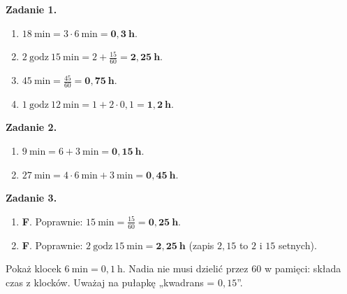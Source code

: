 \documentclass[11pt,a4paper]{article}
\begin{document}

\vspace{0.6em}
\textbf{Zadanie 1.}
\begin{enumerate}[label=\alph*), leftmargin=*, itemsep=4pt]
  \item $18\ \text{min}=3\cdot 6\ \text{min}=\mathbf{0{,}3\ h}$.
  \item $2\ \text{godz}\ 15\ \text{min}=2+\frac{15}{60}=\mathbf{2{,}25\ h}$.
  \item $45\ \text{min}=\frac{45}{60}=\mathbf{0{,}75\ h}$.
  \item $1\ \text{godz}\ 12\ \text{min}=1+2\cdot 0{,}1=\mathbf{1{,}2\ h}$.
\end{enumerate}

\textbf{Zadanie 2.}
\begin{enumerate}[label=\alph*), leftmargin=*, itemsep=4pt]
  \item $9\ \text{min}=6+3\ \text{min}=\mathbf{0{,}15\ h}$.
  \item $27\ \text{min}=4\cdot 6\ \text{min}+3\ \text{min}=\mathbf{0{,}45\ h}$.
\end{enumerate}

\textbf{Zadanie 3.}
\begin{enumerate}[label=\alph*), leftmargin=*, itemsep=4pt]
  \item \textbf{F}. Poprawnie: $15\ \text{min}=\frac{15}{60}=\mathbf{0{,}25\ h}$.
  \item \textbf{F}. Poprawnie: $2\ \text{godz}\ 15\ \text{min}=\mathbf{2{,}25\ h}$ (zapis $2{,}15$ to $2$ i $15$ setnych).
\end{enumerate}

\vspace{0.6em}
\begin{tcolorbox}[colback=white, colframe=okres, boxrule=0.6pt, arc=2pt, title=Wskazówka dla Pawła]
Pokaż klocek $6\ \text{min}=0{,}1\ \text{h}$. Nadia nie musi dzielić przez $60$ w pamięci: składa czas z klocków. Uważaj na pułapkę „kwadrans = $0{,}15$”.
\end{tcolorbox}
\end{document}
